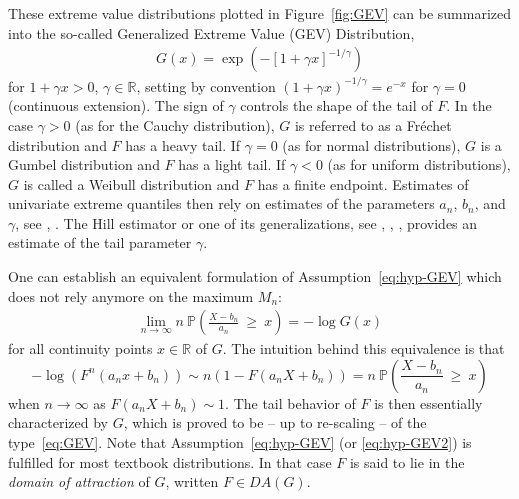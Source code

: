 These extreme value distributions plotted in Figure~\ref{fig:GEV} can be summarized into the so-called Generalized Extreme Value (GEV) Distribution,
\begin{align}
\label{eq:GEV}
G(x) = \exp \left(-\left[1 + \gamma x\right]^{-1/\gamma}\right)
\end{align}
for $1 + \gamma x > 0$, $\gamma \in \mathbb{R}$,
setting by convention $(1 + \gamma x)^{-1/\gamma} = e^{-x}$ for
$\gamma = 0$ (continuous extension). %
The sign of $\gamma$ controls the shape of the tail of $F$.
 In the case $\gamma >0$ (as for the Cauchy distribution), $G$ is referred to as a Fréchet distribution and $F$ has a heavy tail. If $\gamma=0$ (as for normal distributions), $G$ is a Gumbel distribution and $F$ has a light tail. If $\gamma < 0$ (as for uniform distributions), $G$ is called a Weibull distribution and $F$ has a finite endpoint.
Estimates of univariate extreme quantiles then rely on estimates of the parameters $a_n$, $b_n$, and $\gamma$, see \cite{DEd1989}, \cite{ELL2009}. 
The Hill estimator or one of its generalizations, see \cite{Hill1975}, \cite{Smith1987}, \cite{BVT1996}, provides an estimate of the tail parameter $\gamma$. 


One can establish an equivalent formulation of Assumption~\eqref{eq:hyp-GEV} which does not rely anymore on the maximum $M_n$:
\begin{align}
\label{eq:hyp-GEV2} %
\lim_{n \to \infty} n ~\mathbb{P}\left( \frac{X - b_n}{a_n} ~\ge~ x \right) = -\log G(x)
\end{align}
for all continuity points $x \in \mathbb{R}$ of $G$.
The intuition behind this equivalence is that $$- \log(F^n(a_n x + b_n)) \sim n (1 - F(a_n X + b_n)) = n ~\mathbb{P}\left( \frac{X - b_n}{a_n}~\ge~ x \right)$$ when $n \to \infty$ as $F(a_n X + b_n) \sim 1$.
 The tail behavior of $F$
is then essentially characterized by $G$, which is proved to be -- up
to  re-scaling -- of the type~\eqref{eq:GEV}. 
\medskip
Note that Assumption~\eqref{eq:hyp-GEV} (or \eqref{eq:hyp-GEV2}) is fulfilled for most textbook distributions. In that case $F$ is said to lie in the \textit{domain of  attraction} of $G$, written $F \in DA(G)$.

